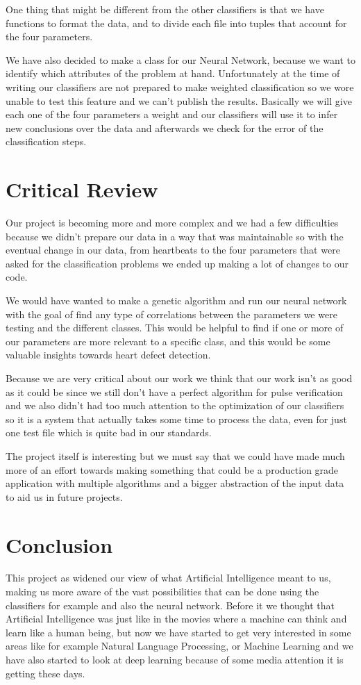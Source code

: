 \documentclass[conference]{IEEEtran}
\begin{document}
One thing that might be different from the other classifiers is that we have
functions to format the data, and to divide each file into tuples that account
for the four parameters.

We have also decided to make a class for our Neural Network, because we want to
identify which attributes of the problem at hand. Unfortunately at the time of
writing our classifiers are not prepared to make weighted classification so we
wore unable to test this feature and we can't publish the results.
Basically we will give each one of the four parameters a weight and our
classifiers will use it to infer new conclusions over the data and afterwards
we check for the error of the classification steps.

\section{Critical Review}
Our project is becoming more and more complex and we had a few difficulties
because we didn't prepare our data in a way that was maintainable so with the
eventual change in our data, from heartbeats to the four parameters that were
asked for the classification problems we ended up making a lot of changes to our
code.

We would have wanted to make a genetic algorithm and run our neural network with
the goal of find any type of correlations between the parameters we were testing
and the different classes. This would be helpful to find if one or more of our
parameters are more relevant to a specific class, and this would be some
valuable insights towards heart defect detection.

Because we are very critical about our work we think that our work isn't as
good as it could be since we still don't have a perfect algorithm for pulse
verification and we also didn't had too much attention to the optimization of
our classifiers so it is a system that actually takes some time to process the
data, even for just one test file which is quite bad in our standards.

The project itself is interesting but we must say that we could have made much
more of an effort towards making something that could be a production grade
application with multiple algorithms and a bigger abstraction of the input data
to aid us in future projects.

\section{Conclusion}
This project as widened our view of what Artificial Intelligence meant to us,
making us more aware of the vast possibilities that can be done using the
classifiers for example and also the neural network. Before it we thought that
Artificial Intelligence was just like in the movies where a machine can think
and learn like a human being, but now we have started to get very interested in
some areas like for example Natural Language Processing, or Machine Learning and
we have also started to look at deep learning because of some media attention
it is getting these days.
\end{document}
